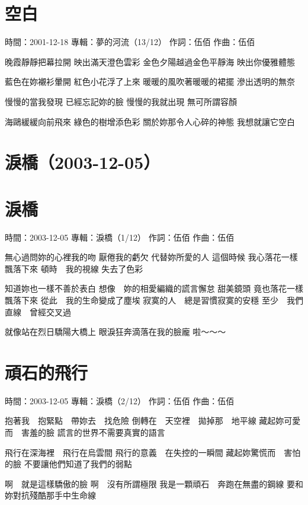 \documentclass[UTF8,a4paper,oneside,twocolumn,12pt]{ctexbook}
\newcommand{\infopair}[2]{\textbullet #1：#2}
\newcommand{\zc}[1][伍佰]{\infopair{作詞}{#1}}
\newcommand{\zq}[1][伍佰]{\infopair{作曲}{#1}}
\newcommand{\zj}[1]{\infopair{專輯}{#1}}
\newcommand{\sj}[1]{\infopair{時間}{#1}}
\newenvironment{info}{\begin{flushleft}\kaishu
	}
	{\end{flushleft}\normalsize\yahei\par}
\newenvironment{lyric}{
	}
{}
\begin{document}
\section{空白}
\begin{info}
	\sj{2001-12-18}
	\zj{夢的河流（13/12）}
	\zc
	\zq
\end{info}
\begin{lyric}
	晚霞靜靜把幕拉開
	映出滿天澄色雲彩
	金色夕陽越過金色平靜海
	映出你優雅體態

	藍色在妳襯衫暈開
	紅色小花浮了上來
	暖暖的風吹著暖暖的裙擺
	滲出透明的無奈

	慢慢的當我發現
	已經忘記妳的臉
	慢慢的我就出現
	無可所謂容顏

	海鷗緩緩向前飛來
	綠色的樹增添色彩
	關於妳那令人心碎的神態
	我想就讓它空白
\end{lyric}

\section*{淚橋（2003-12-05）}
\section{淚橋}
\begin{info}
	\sj{2003-12-05}
	\zj{淚橋（1/12）}
	\zc
	\zq
\end{info}
\begin{lyric}
	無心過問妳的心裡我的吻
	厭倦我的虧欠 代替妳所愛的人
	這個時候
	我心落花一樣飄落下來
	頓時　我的視線
	失去了色彩

	知道妳也一樣不善於表白
	想像　妳的相愛編織的謊言懈怠
	甜美鏡頭
	竟也落花一樣飄落下來
	從此　我的生命變成了塵埃
	寂寞的人　總是習慣寂寞的安穩
	至少　我們直線　曾經交叉過

	就像站在烈日驕陽大橋上
	眼淚狂奔滴落在我的臉龐
	啦～～～
\end{lyric}

\section{頑石的飛行}
\begin{info}
	\sj{2003-12-05}
	\zj{淚橋（2/12）}
	\zc
	\zq
\end{info}
\begin{lyric}
	抱著我　抱緊點　帶妳去　找危險
	倒轉在　天空裡　拋掉那　地平線
	藏起妳可愛而　害羞的臉
	謊言的世界不需要真實的語言

	飛行在深海裡　飛行在烏雲間
	飛行的意義　在失控的一瞬間
	藏起妳驚慌而　害怕的臉
	不要讓他們知道了我們的弱點

	啊　就是這樣驕傲的臉
	啊　沒有所謂極限
	我是一顆頑石　奔跑在無盡的鋼線
	要和妳對抗殘酷那手中生命線
\end{lyric}
\end{document}
